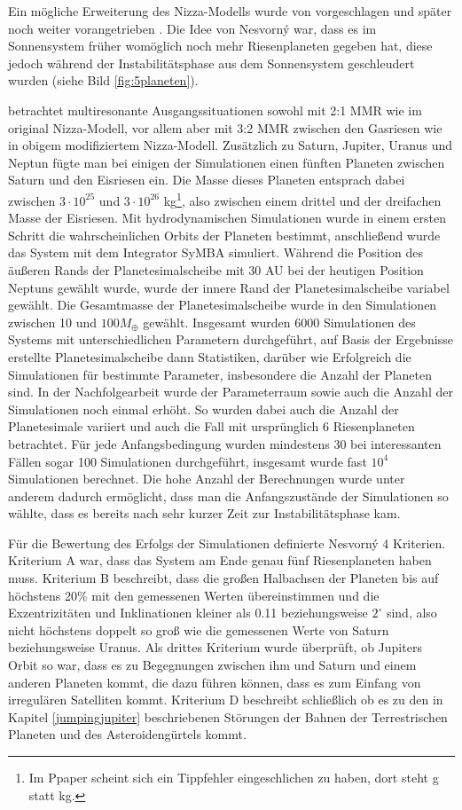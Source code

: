 \documentclass[12pt,a4paper,twoside]{article}
\begin{document}
Ein mögliche Erweiterung des Nizza-Modells wurde von \cite{Nesvorny2011} vorgeschlagen und später noch weiter vorangetrieben \cite{Nesvorny2012}. Die Idee von Nesvorný war, dass es im Sonnensystem früher womöglich noch mehr Riesenplaneten gegeben hat, diese jedoch während der Instabilitätsphase aus dem Sonnensystem geschleudert wurden (siehe Bild \ref{fig:5planeten}).

\cite{Nesvorny2011} betrachtet multiresonante Ausgangssituationen sowohl mit 2:1 MMR wie im original Nizza-Modell, vor allem aber mit 3:2 MMR zwischen den Gasriesen wie in obigem modifiziertem Nizza-Modell.
Zusätzlich zu Saturn, Jupiter, Uranus und Neptun fügte man bei einigen der Simulationen einen fünften Planeten zwischen Saturn und den Eisriesen ein. Die Masse dieses Planeten entsprach dabei zwischen $3\cdot10^25$ und $3\cdot10^26$ kg\footnote{Im Ppaper \cite{Nesvorny2011} scheint sich ein Tippfehler eingeschlichen zu haben, dort steht g statt kg.}, also zwischen einem drittel und der dreifachen Masse der Eisriesen.
Mit hydrodynamischen Simulationen wurde in einem ersten Schritt die wahrscheinlichen Orbits der Planeten bestimmt, anschließend wurde das System mit dem Integrator SyMBA simuliert.
Während die Position des äußeren Rands der Planetesimalscheibe mit 30 AU bei der heutigen Position Neptuns gewählt wurde, wurde der innere Rand der Planetesimalscheibe variabel gewählt.
Die Gesamtmasse der Planetesimalscheibe wurde in den Simulationen zwischen 10 und $100 M_\oplus$ gewählt.
Insgesamt wurden 6000 Simulationen des Systems mit unterschiedlichen Parametern durchgeführt, auf Basis der Ergebnisse erstellte Planetesimalscheibe dann Statistiken, darüber wie Erfolgreich die Simulationen für bestimmte Parameter, insbesondere die Anzahl der Planeten sind.
In der Nachfolgearbeit \cite{Nesvorny2012} wurde der Parameterraum sowie auch die Anzahl der Simulationen noch einmal erhöht. So wurden dabei auch die Anzahl der Planetesimale variiert und auch die Fall mit ursprünglich 6 Riesenplaneten betrachtet. Für jede Anfangsbedingung wurden mindestens 30 bei interessanten Fällen sogar 100 Simulationen durchgeführt, insgesamt wurde fast $10^4$ Simulationen berechnet. Die hohe Anzahl der Berechnungen wurde unter anderem dadurch ermöglicht, dass man die Anfangszustände der Simulationen so wählte, dass es bereits nach sehr kurzer Zeit zur Instabilitätsphase kam.

Für die Bewertung des Erfolgs der Simulationen definierte Nesvorný 4 Kriterien. Kriterium A war, dass das System am Ende genau fünf Riesenplaneten haben muss. Kriterium B beschreibt, dass die großen Halbachsen der Planeten bis auf höchstens 20\% mit den gemessenen Werten übereinstimmen und die Exzentrizitäten und Inklinationen kleiner als 0.11 beziehungsweise $2^\circ$ sind, also nicht höchstens doppelt so groß wie die gemessenen Werte von Saturn beziehungsweise Uranus.
Als drittes Kriterium wurde überprüft, ob Jupiters Orbit so war, dass es zu Begegnungen zwischen ihm und Saturn und einem anderen Planeten kommt, die dazu führen können, dass es zum Einfang von irregulären Satelliten kommt.
Kriterium D beschreibt schließlich ob es zu den in Kapitel \ref{jumpingjupiter} beschriebenen Störungen der Bahnen der Terrestrischen Planeten und des Asteroidengürtels kommt. %
\end{document}
